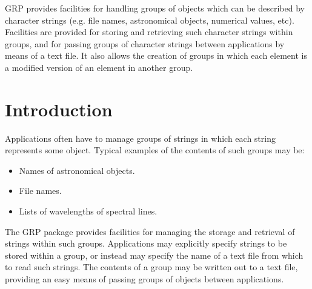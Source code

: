 
GRP provides facilities for handling groups of objects which can be described by
character strings (e.g. file names, astronomical objects, numerical values,
etc). Facilities are provided for storing and retrieving such character strings
within groups, and for passing groups of character strings between applications
by means of a text file. It also allows the creation of groups in which each
element is a modified version of an element in another group.

 \newpage
 \begin{latexonly}
   \setlength{\parskip}{0mm}
   \latexonlytoc
   \setlength{\parskip}{\medskipamount}
   \markright{\stardocname}
 \end{latexonly}
\newpage
\renewcommand{\thepage}{\arabic{page}}
\setcounter{page}{1}

\section {Introduction}

Applications often have to manage groups of strings in which each string
represents some object. Typical examples of the contents of such groups may be:

\begin{itemize}
\item Names of astronomical objects.
\item File names.
\item Lists of wavelengths of spectral lines.
\end{itemize}

The GRP package provides facilities for managing the storage and retrieval of
strings within such groups. Applications may explicitly specify strings to be
stored within a group, or instead may specify the name of a text file from which
to read such strings. The contents of a group may be written out to a text file,
providing an easy means of passing groups of objects between applications.

